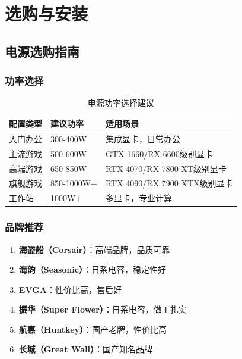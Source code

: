 \documentclass[12pt,UTF8]{ctexbook}
\begin{document}
\part{选购与安装}

\chapter{电源选购指南}

\section{功率选择}

\begin{table}[H]
    \centering
    \begin{tabular}{|p{3cm}|p{3cm}|p{6cm}|}
        \hline
        \textbf{配置类型} & \textbf{建议功率} & \textbf{适用场景} \\
        \hline
        入门办公 & 300-400W & 集成显卡，日常办公 \\
        \hline
        主流游戏 & 500-600W & GTX 1660/RX 6600级别显卡 \\
        \hline
        高端游戏 & 650-850W & RTX 4070/RX 7800 XT级别显卡 \\
        \hline
        旗舰游戏 & 850-1000W+ & RTX 4090/RX 7900 XTX级别显卡 \\
        \hline
        工作站 & 1000W+ & 多显卡，专业计算 \\
        \hline
    \end{tabular}
    \caption{电源功率选择建议}
    \label{tab:psu_power_selection}
\end{table}

\section{品牌推荐}

\begin{enumerate}
    \item \textbf{海盗船（Corsair）}：高端品牌，品质可靠
    \item \textbf{海韵（Seasonic）}：日系电容，稳定性好
    \item \textbf{EVGA}：性价比高，售后好
    \item \textbf{振华（Super Flower）}：日系电容，做工扎实
    \item \textbf{航嘉（Huntkey）}：国产老牌，性价比高
    \item \textbf{长城（Great Wall）}：国产知名品牌
\end{enumerate}
\end{document}
